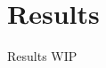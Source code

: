 \documentclass[../../UsabilityReport.tex]{subfiles}
\begin{document}
\section{Results}
	Results WIP
\end{document}

